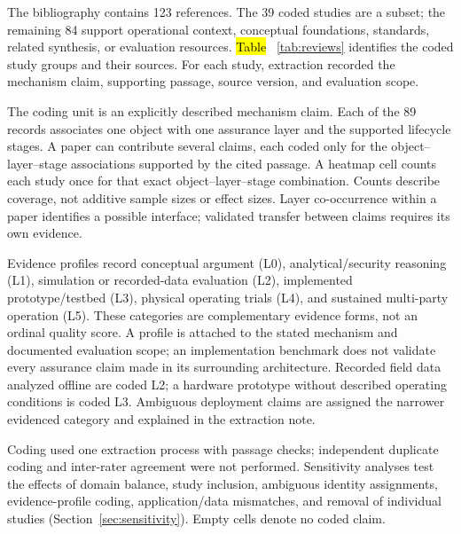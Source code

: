 \documentclass[blockchains,review,accept,moreauthors]{Definitions/mdpi}
\begin{document}
The bibliography contains 123 references. The 39 coded studies are a subset; the remaining 84 support operational context, conceptual foundations, standards, related synthesis, or evaluation resources. \hl{Table}%
~\ref{tab:reviews} identifies the coded study groups and their sources. For each study, extraction recorded the mechanism claim, supporting passage, source version, and evaluation scope.

The coding unit is an explicitly described mechanism claim. Each of the 89 records associates one object with one assurance layer and the supported lifecycle stages. A paper can contribute several claims, each coded only for the object--layer--stage associations supported by the cited passage. A heatmap cell counts each study once for that exact object--layer--stage combination. Counts describe coverage, not additive sample sizes or effect sizes. Layer co-occurrence within a paper identifies a possible interface; validated transfer between claims requires its own evidence.

Evidence profiles record conceptual argument (L0), analytical/security reasoning (L1), simulation or recorded-data evaluation (L2), implemented prototype/testbed (L3), physical operating trials (L4), and sustained multi-party operation (L5). These categories are complementary evidence forms, not an ordinal quality score. A profile is attached to the stated mechanism and documented evaluation scope; an implementation benchmark does not validate every assurance claim made in its surrounding architecture. Recorded field data analyzed offline are coded L2; a hardware prototype without described operating conditions is coded L3. Ambiguous deployment claims are assigned the narrower evidenced category and explained in the extraction note.

Coding used one extraction process with passage checks; independent duplicate coding and inter-rater agreement were not performed. Sensitivity analyses test the effects of domain balance, study inclusion, ambiguous identity assignments, evidence-profile coding, application/data mismatches, and removal of individual studies (Section~\ref{sec:sensitivity}). Empty cells denote no coded claim.
\end{document}
